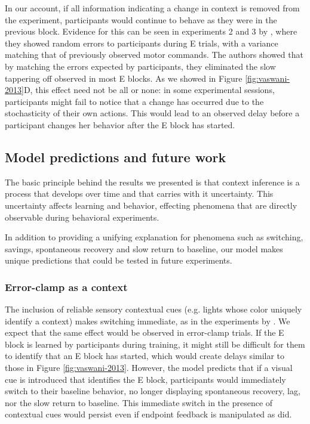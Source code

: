 \documentclass[a4paper,doc,floatsintext,natbib]{apa6}
\def \fref #1{Figure \ref{#1}}     %
\begin{document}
In our account, if all information indicating a change in context is removed from the experiment, participants would continue to behave as they were in the previous block. Evidence for this can be seen in experiments 2 and 3 by \cite{Vaswani_Decay_2013}, where they showed random errors to participants during E trials, with a variance matching that of previously observed motor commands. The authors showed that by matching the errors expected by participants, they eliminated the slow tappering off observed in most E blocks. As we showed in \fref{fig:vaswani-2013}D, this effect need not be all or none: in some experimental sessions, participants might fail to notice that a change has occurred due to the stochasticity of their own actions. This would lead to an observed delay before a participant changes her behavior after the E block has started.


\subsection{Model predictions and future work}
The basic principle behind the results we presented is that context inference is a process that develops over time and that carries with it uncertainty. This uncertainty affects learning and behavior, effecting phenomena that are directly observable during behavioral experiments.

In addition to providing a unifying explanation for phenomena such as switching, savings, spontaneous recovery and slow return to baseline, our model makes unique predictions that could be tested in future experiments.

\subsubsection{Error-clamp as a context}
The inclusion of reliable sensory contextual cues (e.g. lights whose color uniquely identify a context) makes switching immediate, as in the experiments by \cite{Kim_Neural_2015}. We expect that the same effect would be observed in error-clamp trials. If the E block is learned by participants during training, it might still be difficult for them to identify that an E block has started, which would create delays similar to those in \fref{fig:vaswani-2013}. However, the model predicts that if a visual cue is introduced that identifies the E block, participants would immediately switch to their baseline behavior, no longer displaying spontaneous recovery, lag, nor the slow return to baseline. This immediate switch in the presence of contextual cues would persist even if endpoint feedback is manipulated as \cite{Vaswani_Decay_2013} did.
\end{document}
